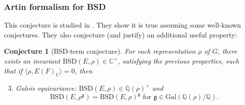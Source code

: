 \documentclass{beamer}
\newcommand{\Gal}{\mathrm{Gal}}
\newcommand{\BSD}{\mathrm{BSD}}
\newcommand{\Tr}{\mathrm{Tr}}
\newcommand{\CC}{\mathbb{C}}
\newcommand{\QQ}{\mathbb{Q}}
\newcommand{\fg}{\mathfrak{g}}
\newcommand{\bQ}{\mathbb{Q}}
\newcommand{\bC}{\mathbb{C}}
\newcommand{\bZ}{\mathbb{Z}}
\theoremstyle{plain}
\newtheorem{conjecture}[thm]{Conjecture}
\begin{document}
\begin{frame}
    \frametitle{Artin formalism for BSD}
This conjecture is studied in \cite{DEW1}. They show it is true assuming some well-known conjectures. \pause They also conjecture (and justify) an additional useful property: 

\begin{conjecture}[BSD-term conjecture]
    For each representation $\rho$ of $G$, there exists an invariant $\BSD(E, \rho) \in \CC^{\times}$, satisfying the previous properties, \pause such that if $\langle \rho, E(F)_{\CC} \rangle = 0$, then
    \begin{enumerate}\setcounter{enumi}{2}
        \item Galois equivariance: $\BSD(E, \rho) \in \QQ(\rho)^{\times}$ and $$\BSD(E, \rho^{\mathfrak{g}}) = \BSD(E, \rho)^{\mathfrak{g}} \text{ for } \mathfrak{g} \in \Gal(\bQ(\rho) / \bQ).$$ 
    \end{enumerate}

\end{conjecture}
\end{frame}

    
\end{document}
